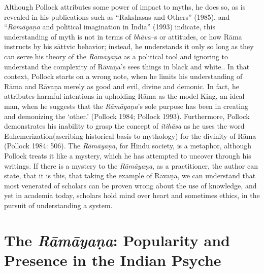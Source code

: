 {Although Pollock attributes some power of impact to myths, he does so, as is revealed in his publications such as “Rakshasas and Others” (1985), and “\textit{Rāmāyaṇa} and political imagination in India” (1993) indicate, this understanding of myth is not in terms of \textit{bhāva}–s or attitudes, or how Rāma instructs by his sāttvic behavior; instead, he understands it only so long as they can serve his theory of the \textit{Rāmāyaṇa} as a political tool and ignoring to understand the complexity of Rāvaṇa’s sees things in black and white.}. In that context, Pollock starts on a wrong note, when he limits his understanding of Rāma and Rāvaṇa merely as good and evil, divine and demonic. In fact, he attributes harmful intentions in upholding Rāma as the model King, an ideal man, when he suggests that the \textit{Rāmāyaṇa}’s sole purpose has been in creating and demonizing the ‘other.’ (Pollock 1984; Pollock 1993). Furthermore, Pollock demonstrates his inability to grasp the concept of \textit{itihāsa} as he uses the word Euhemerization(ascribing historical basis to mythology) for the divinity of Rāma (Pollock 1984: 506). The \textit{Rāmāyaṇa}, for Hindu society, is a metaphor, although Pollock treats it like a mystery, which he has attempted to uncover through his writings. If there is a mystery to the \textit{Rāmāyaṇa}, as a practitioner, the author can state, that it is this, that taking the example of Rāvaṇa, we can understand that most venerated of scholars can be proven wrong about the use of knowledge, and yet in academia today, scholars hold mind over heart and sometimes ethics, in the pursuit of understanding a system.


\section*{The \textit{Rāmāyaṇa}: Popularity and Presence in the Indian Psyche}

